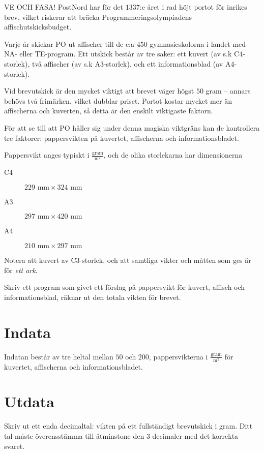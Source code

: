 VE OCH FASA!
PostNord har för det $1337$:e året i rad höjt portot för inrikes brev, vilket riskerar att bräcka Programmeringsolympiadens affischutskicksbudget.

Varje år skickar PO ut affischer till de c:a $450$ gymnasieskolorna i landet med NA- eller TE-program.
Ett utskick består av tre saker: ett kuvert (av s.k C4-storlek), två affischer (av s.k A3-storlek), och ett informationsblad (av A4-storlek).

Vid brevutskick är den mycket viktigt att brevet väger högst $50$ gram -- annars behövs två frimärken, vilket dubblar priset.
Portot kostar mycket mer än affischerna och kuverten, så detta är den enskilt viktigaste faktorn.

För att se till att PO håller sig under denna magiska viktgräns kan de kontrollera tre faktorer: pappersvikten på kuvertet, affischerna och informationsbladet.

Pappersvikt anges typiskt i $\frac{\text{gram}}{\text{m}^2}$, och de olika storlekarna har dimensionerna 
\begin{description}
\item[C4] $229\text{ mm} \times 324\text{ mm}$
\item[A3] $297\text{ mm} \times 420\text{ mm}$
\item[A4] $210\text{ mm} \times 297\text{ mm}$
\end{description}
Notera att kuvert  av C3-storlek, och att samtliga vikter och måtten som ges är för \emph{ett ark}.

Skriv ett program som givet ett förslag på pappersvikt för kuvert, affisch och informationsblad, räknar ut den totala vikten för brevet.

\section*{Indata}
Indatan består av tre heltal mellan $50$ och $200$, pappersvikterna i $\frac{\text{gram}}{\text{m}^2}$ för kuvertet, affischerna och informationsbladet.

\section*{Utdata}
Skriv ut ett enda decimaltal: vikten på ett fullständigt brevutskick i gram.
Ditt tal måste överensstämma till åtminstone den $3$ decimaler med det korrekta svaret.
